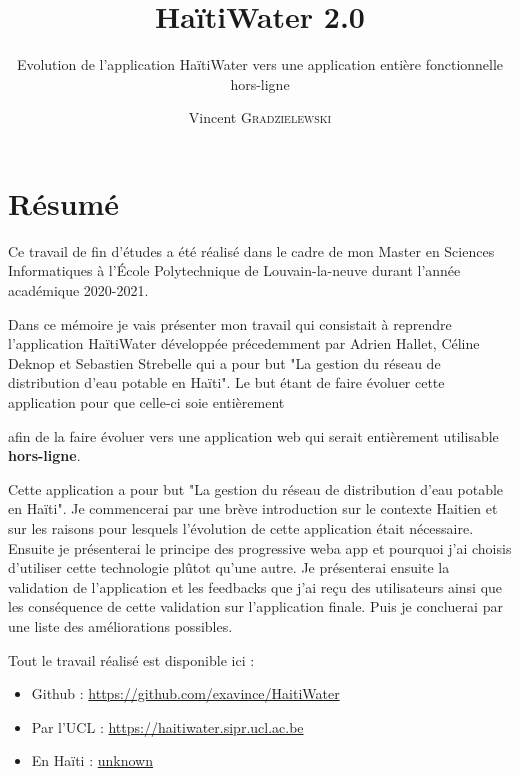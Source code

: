 \documentclass{EPL-master-thesis-covers-FR}
\title{HaïtiWater 2.0}
\subtitle{Evolution de l'application HaïtiWater vers une application entière  fonctionnelle hors-ligne}
\author{Vincent \textsc{Gradzielewski}}%
\begin{document}
	\maketitle
	\tableofcontents

	\setlength{\parskip}{1.5em plus1em minus1em}


	\chapter*{Résumé}
	
	
		Ce travail de fin d'études a été réalisé dans le cadre de mon Master en Sciences Informatiques à l'École Polytechnique de Louvain-la-neuve durant l'année académique 2020-2021.
		
		Dans ce mémoire je vais présenter mon travail qui consistait à reprendre l'application HaïtiWater développée précedemment par Adrien Hallet, Céline Deknop et Sebastien Strebelle qui a pour but "La gestion du réseau de distribution d'eau potable en Haïti". Le but étant de faire évoluer cette application pour que celle-ci soie entièrement
		
		
		 afin de la faire évoluer vers une application web qui serait entièrement utilisable \textbf{hors-ligne}.
		 
		Cette application a pour but "La gestion du réseau de distribution d'eau potable en Haïti". Je commencerai par une brève introduction sur le contexte Haitien et sur les raisons pour lesquels l'évolution de cette application était nécessaire. Ensuite je présenterai le principe des progressive weba app et pourquoi j'ai choisis d'utiliser cette technologie plûtot qu'une autre. Je présenterai ensuite la validation de l'application et les feedbacks que j'ai reçu des utilisateurs ainsi que les conséquence de cette validation sur l'application finale. Puis je concluerai par une liste des améliorations possibles.

		Tout le travail réalisé est disponible ici :

\begin{itemize}
	\item Github : \url{https://github.com/exavince/HaitiWater}
	\item Par l'UCL : \url{https://haitiwater.sipr.ucl.ac.be}
	\item En Haïti : \url{unknown}
\end{itemize}		
\end{document}

